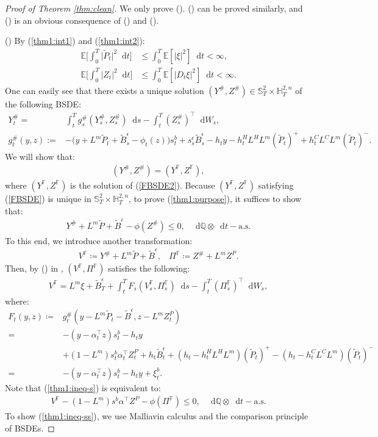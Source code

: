 \documentclass[a4paper, 11pt]{article}              %
\numberwithin{equation}{section}
\theoremstyle{plain}
\newcommand{\dqdt}{\df \dsQ \otimes \df t-\text{a.s}}
\newcommand{\1}{\mathds{1}}
\newcommand{\Bt}{\tilde{B}}
\newcommand{\pt}{\tilde{P}}
\newcommand{\dsE}{\mathbb{E}}
\newcommand{\dsF}{\mathbb{F}}
\newcommand{\dsH}{\mathbb{H}}
\newcommand{\dsQ}{\mathbb{Q}}
\newcommand{\dsS}{\mathbb{S}}
\theoremstyle{plain}
\theoremstyle{definition}
\theoremstyle{plain}
\newcommand*\df{\mathop{}\!\mathrm{d}}
\newcommand{\rom}[1]{\lowercase\expandafter{\romannumeral #1\relax}}
\begin{document}
\begin{proof}[Proof of Theorem \ref{thm:clean}]We only prove
  (\rom{1}). (\rom{2}) can be proved similarly, and (\rom{3}) is an obvious
  consequence of (\rom{1}) and (\rom{2}).
  
(\rom{1}) By (\ref{thm1:int1}) and (\ref{thm1:int2}):
\begin{align}
  \dsE\bigg[ \int_{0}^{T}\big|\pt _t\big|^2\df t\bigg]
  & \leq
     \int_{0}^{T}\dsE[|\xi|^2]\df t<\infty,\nonumber \\
  \dsE\bigg[ \int_{0}^{T}\big|Z _t\big|^2\df t\bigg]
  & \leq
     \int_{0}^{T}\dsE[|D_t\xi|^2]\df t<\infty.\nonumber 
\end{align}
One can easily  see that there exists a unique solution $(Y^\#,Z^\#) \in \dsS^2_T
\times \dsH^{2, n}_T$ of the following BSDE:
\begin{align}
  Y^\#_t =& \int_{t}^{T}g^\#_s(Y^\#_s, Z^\#_s)\df s    -\int_{t}^{T}(Z^\#_s)^\top\df W_s,
            \nonumber \\
  g^\#_t(y, z):=&-\big(y +L^m\pt_t+\Bt^\epsilon_s-\phi_t(z)\big)s^{b}_t
  +s^\epsilon_s\Bt^\epsilon_s
  -h_ty  -h^H_tL^HL^m(\pt_t)^++h^C_tL^CL^m(\pt_t)^-. \nonumber 
\end{align}
We will show that:
\begin{align}
(Y^\#, Z^\#) = (Y^\dsF, Z^\dsF), \label{thm1:purpose}
\end{align}
where $(Y^\dsF, Z^\dsF)$ is the solution of (\ref{FBSDE2}). Because $(Y^\dsF,
Z^\dsF)$ satisfying (\ref{FBSDE}) is unique in $\dsS^2_T \times \dsH^{2, n}_T$, to prove
(\ref{thm1:purpose}), it suffices to show that:
\begin{align}
 Y^\# + L^m\pt +\Bt^\epsilon- \phi(Z^\#) \leq0 , ~~~\dqdt.  \label{thm1:ineq-s}
\end{align}
To this end, we
introduce another transformation:
\begin{align}
  V^\dsF \coloneqq Y^\# + L^m\pt+\Bt^\epsilon,
  ~~~~\Pi^\dsF \coloneqq Z^\# + L^mZ^P. \nonumber 
\end{align}
Then, by (\rom{3}) in , $(V^\dsF, \Pi^\dsF)$ satisfies the following:
\begin{align}
  V^\dsF = L^m\xi +\Bt^\epsilon_T +\int_{t}^{T}F_s(V^\dsF_s, \Pi^\dsF_s)\df s
  - \int_{t}^{T}(\Pi^\dsF_s)^\top\df W_s,\nonumber 
\end{align}
where:
\begin{align}
  F_t(y, z) \coloneqq
  &  g^{\#}_t(y - L^m\pt_t-\Bt^\epsilon, z -  L^mZ^P_t)\nonumber\\
  =&-(y - \alpha^\top_tz)s^b_t - h_ty\nonumber\\
  &+ (1-L^m)s^b_t\alpha^\top_t Z^P_t 
    +h_t\Bt^\epsilon_t+(h_t-h^H_tL^HL^m)(\pt_t)^+-(h_t-h^C_tL^CL^m)(\pt_t)^- \nonumber\\
  =&-(y - \alpha^\top_tz)s^b_t- h_ty + \xi^b_t.\nonumber 
\end{align}
Note that (\ref{thm1:ineq-s}) is equivalent to:
\begin{align}
  V^\dsF - (1-L^m)s^b\alpha^\top Z^P  - \phi(\Pi^\dsF)\leq 0, ~~~\dqdt. 
  \label{thm1:ineq-ss}
\end{align}
To show (\ref{thm1:ineq-ss}), we use Malliavin calculus and the comparison principle
of BSDEs.


\end{proof}
\end{document}
